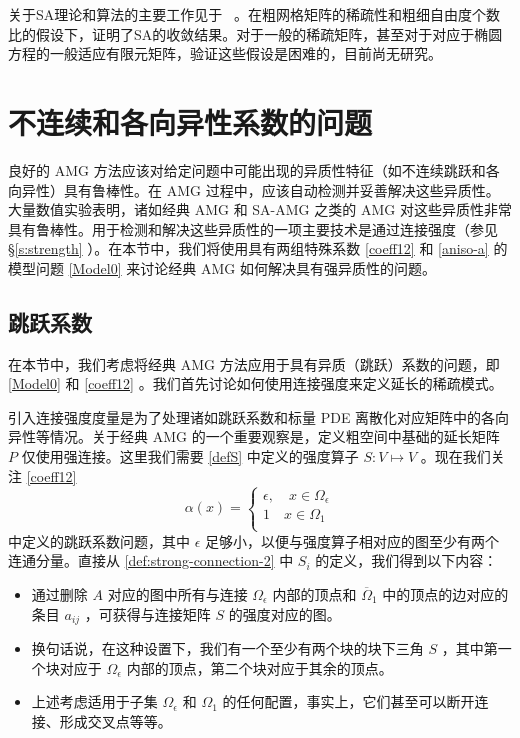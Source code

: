 \documentclass[12pt]{acta_2011xz}
\begin{document}
关于SA理论和算法的主要工作见于~   \cite{Vanek.P;Mandel.J;Brezina.M.1998a}   。在粗网格矩阵的稀疏性和粗细自由度个数比的假设下，证明了SA的收敛结果。对于一般的稀疏矩阵，甚至对于对应于椭圆方程的一般适应有限元矩阵，验证这些假设是困难的，目前尚无研究。  

   \section{不连续和各向异性系数的问题  }    
   \label{s:AnisoJump}    良好的 AMG 方法应该对给定问题中可能出现的异质性特征（如不连续跳跃和各向异性）具有鲁棒性。在 AMG 过程中，应该自动检测并妥善解决这些异质性。大量数值实验表明，诸如经典 AMG 和 SA-AMG 之类的 AMG 对这些异质性非常具有鲁棒性。用于检测和解决这些异质性的一项主要技术是通过连接强度（参见    \S       \ref{s:strength}    ）。在本节中，我们将使用具有两组特殊系数    \eqref{coeff12}    和    \eqref{aniso-a}    的模型问题    \eqref{Model0}    来讨论经典 AMG 如何解决具有强异质性的问题。  

   \subsection{跳跃系数  }    在本节中，我们考虑将经典 AMG 方法应用于具有异质（跳跃）系数的问题，即    \eqref{Model0}    和    \eqref{coeff12}    。我们首先讨论如何使用连接强度来定义延长的稀疏模式。  

引入连接强度度量是为了处理诸如跳跃系数和标量 PDE 离散化对应矩阵中的各向异性等情况。关于经典 AMG 的一个重要观察是，定义粗空间中基础的延长矩阵    $P$    仅使用强连接。这里我们需要    \eqref{defS}    中定义的强度算子    $S: V\mapsto V$   。现在我们关注    \eqref{coeff12}    
   \[
\alpha(x) = \begin{cases}
\epsilon, \quad x\in \Omega_\epsilon \\ 
1 \quad x\in \Omega_1 \\ 
\end{cases}
\]    中定义的跳跃系数问题，其中    $\epsilon$    足够小，以便与强度算子相对应的图至少有两个连通分量。直接从    \eqref{def:strong-connection-2}    中    $S_i$    的定义，我们得到以下内容：  

   \begin{itemize}

   \item   通过删除    $A$    对应的图中所有与连接    $\Omega_\epsilon$    内部的顶点和    $\overline{\Omega}_1$    中的顶点的边对应的条目    $a_{ij}$   ，可获得与连接矩阵    $S$    的强度对应的图。   \item   换句话说，在这种设置下，我们有一个至少有两个块的块下三角    $S$   ，其中第一个块对应于    $\Omega_\epsilon$    内部的顶点，第二个块对应于其余的顶点。   \item   上述考虑适用于子集    $\Omega_\epsilon$    和    $\Omega_1$    的任何配置，事实上，它们甚至可以断开连接、形成交叉点等等。  \end{itemize}     
\end{document}
